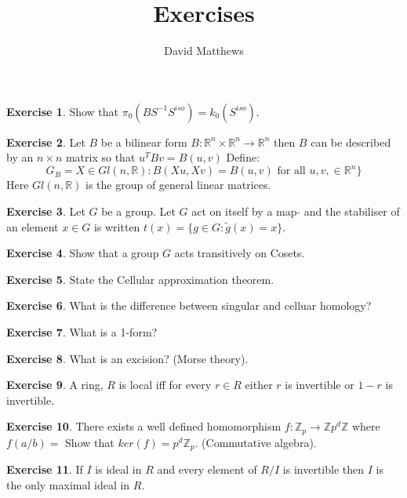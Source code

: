 \documentclass[12pt]{article} %
\title{Exercises}
\author{David Matthews}
\theoremstyle{definition}
\newtheorem*{exer}{Exercise}
\begin{document}
 \begin{exer}
  Show that $\pi_0(BS^{-1}S^{iso}) = k_{0}(S^{iso})$.
 \end{exer}
\begin{exer}
 Let $B$ be a bilinear form $ B :  \mathbb{R}^n\times \mathbb{R}^n \rightarrow \mathbb{R}^n$ then $B$ can be described by an $n \times n$ matrix so that $u^T B v = B(u,v)$ Define:
 \[G_{B} = X \in Gl(n,\mathbb{R}) : B(Xu, Xv) = B(u,v) \text{  for all  } u,v, \in \mathbb{R}^n\}\] 
 Here $Gl(n,\mathbb{R})$ is the group of general linear matrices.  
\end{exer}

\begin{exer}
 Let $G$ be a group. Let $G$ act on itself by a map $\tilde{}$ and the stabiliser of an element $x \in G$ is written $t(x) = \{ g \in G : \tilde{g}(x) = x\}$.  
\end{exer}

\begin{exer}
 Show that a group $G$ acts transitively on Cosets. 
\end{exer}


 
 \begin{exer}
   State the Cellular approximation theorem.
 \end{exer}

 \begin{exer}
  What is the difference between singular and celluar homology?
 \end{exer}

 \begin{exer}
  What is a 1-form?
 \end{exer}

 \begin{exer}
  What is an excision?  (Morse theory).
  
 \end{exer}

 \begin{exer}
  A ring, $R$ is local iff for every $r \in R$ either $r$ is invertible or $1-r$ is invertible.
 \end{exer}

 \begin{exer}
  There exists a well defined homomorphism $f: \mathbb{Z}_p \rightarrow \mathbb{Z}p^d\mathbb{Z}$ where $f(a/b) = $
  Show that $ker(f) = p^d \mathbb{Z}_p$.  (Commutative algebra).
  \end{exer}

  \begin{exer}
   If $I$ is ideal in $R$ and every element of $R/I$ is invertible then $I$ is the only maximal ideal in $R$.
  \end{exer}
\end{document}
